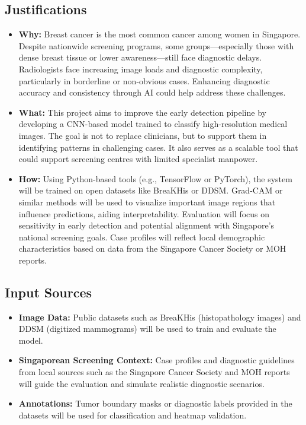 \documentclass[12pt]{article}
\begin{document}
\subsection*{Justifications}
\begin{itemize}
\item \textbf{Why:} Breast cancer is the most common cancer among women in Singapore. Despite nationwide screening programs, some groups—especially those with dense breast tissue or lower awareness—still face diagnostic delays. Radiologists face increasing image loads and diagnostic complexity, particularly in borderline or non-obvious cases. Enhancing diagnostic accuracy and consistency through AI could help address these challenges.

\item \textbf{What:} This project aims to improve the early detection pipeline by developing a CNN-based model trained to classify high-resolution medical images. The goal is not to replace clinicians, but to support them in identifying patterns in challenging cases. It also serves as a scalable tool that could support screening centres with limited specialist manpower.

\item \textbf{How:} Using Python-based tools (e.g., TensorFlow or PyTorch), the system will be trained on open datasets like BreaKHis or DDSM. Grad-CAM or similar methods will be used to visualize important image regions that influence predictions, aiding interpretability. Evaluation will focus on sensitivity in early detection and potential alignment with Singapore's national screening goals. Case profiles will reflect local demographic characteristics based on data from the Singapore Cancer Society or MOH reports.
\end{itemize}

\subsection*{Input Sources}
\begin{itemize}
    \item \textbf{Image Data:} Public datasets such as BreaKHis (histopathology images) and DDSM (digitized mammograms) will be used to train and evaluate the model.
    \item \textbf{Singaporean Screening Context:} Case profiles and diagnostic guidelines from local sources such as the Singapore Cancer Society and MOH reports will guide the evaluation and simulate realistic diagnostic scenarios.
    \item \textbf{Annotations:} Tumor boundary masks or diagnostic labels provided in the datasets will be used for classification and heatmap validation.
\end{itemize}
\end{document}
